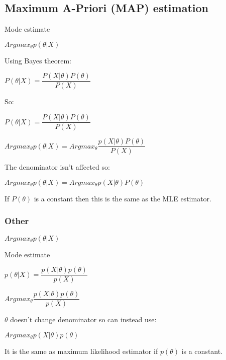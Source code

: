 
\subsection{Maximum A-Priori (MAP) estimation}

Mode estimate

\(Arg max_\theta p(\theta | X)\)

Using Bayes theorem:

\(P(\theta | X)= \dfrac{P(X|\theta )P(\theta)}{P(X)}\)

So:

\(P(\theta | X)= \dfrac{P(X|\theta )P(\theta)}{P(X)}\)

\(Argmax_\theta p(\theta | X)=Argmax_\theta \dfrac{p(X|\theta )P(\theta)}{P(X)}\)

The denominator isn't affected so:

\(Arg max_\theta p(\theta | X)=Arg max_\theta p(X|\theta )P(\theta)\)

If \(P(\theta )\) is a constant then this is the same as the MLE estimator.

\subsubsection{Other}

\(Argmax_\theta p(\theta|X)\)

Mode estimate

\(p(\theta|X)= \dfrac{p(X| \theta)p(\theta )}{p(X)}\)

\(Argmax_\theta \dfrac{p(X| \theta)p(\theta )}{p(X)}\)

\(\theta \) doesn't change denominator so can instead use:

\(Argmax_\theta p(X| \theta)p(\theta )\)

It is the same as maximum likelihood estimator if \(p(\theta )\) is a constant. 

